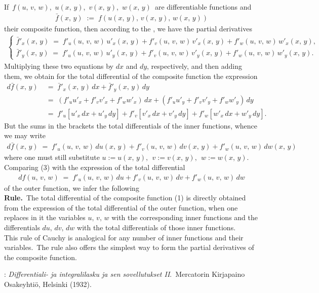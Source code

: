\documentclass[12pt]{article}
\theoremstyle{definition}
\begin{document}
If\, $f(u,\,v,\,w)$,\, $u(x,\,y)$,\, $v(x,\,y)$,\, $w(x,\,y)$\, are differentiable functions and
\begin{align}
\bar{f}(x,\,y) \;:=\; f(u(x,\,y),\,v(x,\,y),\,w(x,\,y))
\end{align}
their composite function, then according to the , we have the partial derivatives
\begin{align}
\begin{cases}
\bar{f}'_x(x,\,y) \;=\; f'_u(u,\,v,\,w)\,u'_x(x,\,y)+f'_v(u,\,v,\,w)\,v'_x(x,\,y)+f'_w(u,\,v,\,w)\,w'_x(x,\,y),\\
\bar{f}'_y(x,\,y) \;=\; f'_u(u,\,v,\,w)\,u'_y(x,\,y)+f'_v(u,\,v,\,w)\,v'_y(x,\,y)+f'_w(u,\,v,\,w)\,w'_y(x,\,y).
\end{cases}
\end{align}
Multiplying these two equations by $dx$ and $dy$, respectively, and then adding them, we obtain for the total differential of the composite function the expression
\begin{align*}
d\bar{f}(x,\,y) &\;=\; \bar{f}'_x(x,\,y)\,dx+\bar{f}'_y(x,\,y)\,dy\\
 &\;=\; (f'_uu'_x+f'_vv'_x+f'_ww'_x)\,dx+(f'_uu'_y+f'_vv'_y+f'_ww'_y)\,dy\\
 &\;=\; f'_u[u'_x\,dx+u'_y\,dy]+f'_v[v'_x\,dx+v'_y\,dy]+f'_w[w'_x\,dx+w'_y\,dy].
\end{align*}
But the sums in the brackets  the total differentials of the inner functions, whence we may write 
\begin{align}
d\bar{f}(x,\,y) \;=\; f'_u(u,\,v,\,w)\,du(x,\,y)+f'_v(u,\,v,\,w)\,dv(x,\,y)+f'_w(u,\,v,\,w)\,dw(x,\,y)
\end{align}
where one must still substitute\; $u := u(x,\,y),\;\, v := v(x,\,y),\;\, w := w(x,\,y)$.\, Comparing (3) with the expression of the total differential
\begin{align}
df(u,\,v,\,w) \;=\; f'_u(u,\,v,\,w)\,du+f'_v(u,\,v,\,w)\,dv+f'_w(u,\,v,\,w)\,dw
\end{align}
of the outer function, we infer the following\\

\textbf{Rule.}\, The total differential of the composite function (1) is directly obtained from the expression of the total differential of the outer function, when one replaces in it the variables $u,\,v,\,w$ with the corresponding inner functions and the differentials $du,\,dv,\,dw$ with the total differentials of those inner functions.\\

This rule of Cauchy is analogical for any number of inner functions and their variables.\, The rule also offers the simplest way to form the partial derivatives of the composite function.

\begin{thebibliography}{8}
: {\em Differentiali- ja integralilasku
ja sen sovellutukset II}.\, Mercatorin Kirjapaino Osakeyhti\"o, Helsinki (1932).
\end{thebibliography} 





\end{document}
